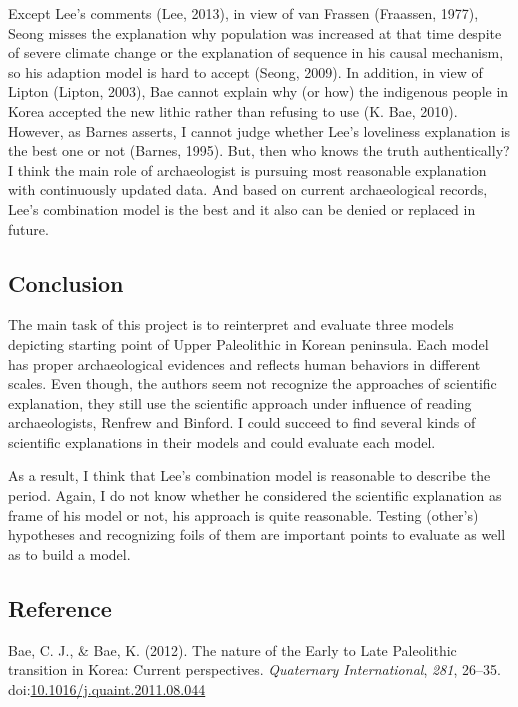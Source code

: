 \documentclass[american,man]{apa6}
\begin{document}
Except Lee's comments (Lee, 2013), in view of van Frassen (Fraassen,
1977), Seong misses the explanation why population was increased at that
time despite of severe climate change or the explanation of sequence in
his causal mechanism, so his adaption model is hard to accept (Seong,
2009). In addition, in view of Lipton (Lipton, 2003), Bae cannot explain
why (or how) the indigenous people in Korea accepted the new lithic
rather than refusing to use (K. Bae, 2010). However, as Barnes asserts,
I cannot judge whether Lee's loveliness explanation is the best one or
not (Barnes, 1995). But, then who knows the truth authentically? I think
the main role of archaeologist is pursuing most reasonable explanation
with continuously updated data. And based on current archaeological
records, Lee's combination model is the best and it also can be denied
or replaced in future.

\subsection{Conclusion}\label{conclusion}

The main task of this project is to reinterpret and evaluate three
models depicting starting point of Upper Paleolithic in Korean
peninsula. Each model has proper archaeological evidences and reflects
human behaviors in different scales. Even though, the authors seem not
recognize the approaches of scientific explanation, they still use the
scientific approach under influence of reading archaeologists, Renfrew
and Binford. I could succeed to find several kinds of scientific
explanations in their models and could evaluate each model.

As a result, I think that Lee's combination model is reasonable to
describe the period. Again, I do not know whether he considered the
scientific explanation as frame of his model or not, his approach is
quite reasonable. Testing (other's) hypotheses and recognizing foils of
them are important points to evaluate as well as to build a model.

\subsection*{Reference}\label{reference}

Bae, C. J., \& Bae, K. (2012). The nature of the Early to Late
Paleolithic transition in Korea: Current perspectives. \emph{Quaternary
International}, \emph{281}, 26--35.
doi:\href{http://dx.doi.org/10.1016/j.quaint.2011.08.044}{10.1016/j.quaint.2011.08.044}
\end{document}
